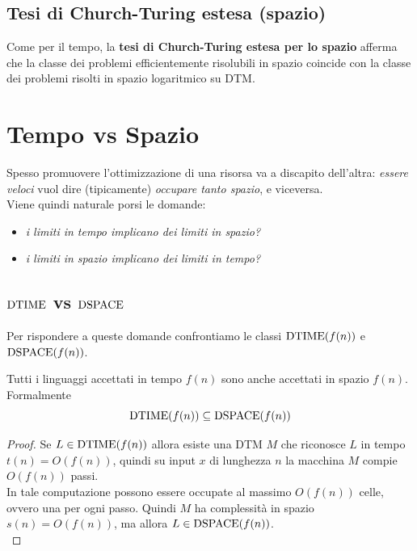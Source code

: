 \subsection{Tesi di Church-Turing estesa (spazio)}

Come per il tempo, la \textbf{tesi di Church-Turing estesa per lo spazio} afferma che la classe dei problemi efficientemente risolubili in spazio coincide con la classe dei problemi risolti in spazio logaritmico su DTM.

\section{Tempo vs Spazio}

Spesso promuovere l'ottimizzazione di una risorsa va a discapito dell'altra: \textit{essere veloci} vuol dire (tipicamente) \textit{occupare tanto spazio}, e viceversa.\\

Viene quindi naturale porsi le domande: 
\begin{itemize}
	\item \textit{i limiti in tempo implicano dei limiti in spazio?}
	\item \textit{i limiti in spazio implicano dei limiti in tempo?}
\end{itemize}

\subsection{$\text{DTIME}$ vs $\text{DSPACE}$}

Per rispondere a queste domande confrontiamo le classi $\text{DTIME} (f(n))$ e $\text{DSPACE} (f(n))$.\\

\begin{theor}
	Tutti i linguaggi accettati in tempo $f(n)$ sono anche accettati in spazio $f(n)$. Formalmente
	$$ \text{DTIME} (f(n)) \subseteq \text{DSPACE} (f(n)) $$
\end{theor}
\begin{proof}
	Se $L \in \text{DTIME}(f(n))$ allora esiste una DTM $M$ che riconosce $L$ in tempo $t(n) = O(f(n))$, quindi su input $x$ di lunghezza $n$ la macchina $M$ compie $O(f(n))$ passi.\\
	
	In tale computazione possono essere occupate al massimo $O(f(n))$ celle, ovvero una per ogni passo. Quindi $M$ ha complessità in spazio $s(n) = O(f(n))$, ma allora $L \in \text{DSPACE} (f(n))$.\\
\end{proof}

